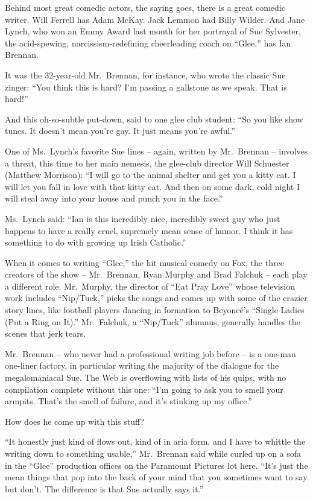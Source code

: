 ﻿\documentclass[12pt]{article}
\begin{document}
Behind most great comedic actors, the saying goes, there is a great comedic writer. Will Ferrell has
Adam McKay. Jack Lemmon had Billy Wilder. And Jane Lynch, who won an Emmy Award last month for her
portrayal of Sue Sylvester, the acid-spewing, narcissism-redefining cheerleading coach on ``Glee,''
has Ian Brennan.

It was the 32-year-old Mr.~Brennan, for instance, who wrote the classic Sue zinger: ``You think this
is hard? I'm passing a gallstone as we speak. That is hard!''

And this oh-so-subtle put-down, said to one glee club student: ``So you like show tunes. It doesn't
mean you're gay. It just means you're awful.''

One of Ms.~Lynch's favorite Sue lines -- again, written by Mr.~Brennan -- involves a threat, this
time to her main nemesis, the glee-club director Will Schuester (Matthew Morrison): ``I will go to
the animal shelter and get you a kitty cat. I will let you fall in love with that kitty cat. And
then on some dark, cold night I will steal away into your house and punch you in the face.''

Ms.~Lynch said: ``Ian is this incredibly nice, incredibly sweet guy who just happens to have a
really cruel, supremely mean sense of humor. I think it has something to do with growing up Irish
Catholic.''

When it comes to writing ``Glee,'' the hit musical comedy on Fox, the three creators of the show --
Mr.~Brennan, Ryan Murphy and Brad Falchuk -- each play a different role. Mr.~Murphy, the director of
``Eat Pray Love'' whose television work includes ``Nip/Tuck,'' picks the songs and comes up with
some of the crazier story lines, like football players dancing in formation to Beyonc\'e's ``Single
Ladies (Put a Ring on It).'' Mr.~Falchuk, a ``Nip/Tuck'' alumnus, generally handles the scenes that
jerk tears.

Mr.~Brennan -- who never had a professional writing job before -- is a one-man one-liner factory, in
particular writing the majority of the dialogue for the megalomaniacal Sue. The Web is overflowing
with lists of his quips, with no compilation complete without this one: ``I'm going to ask you to
smell your armpits. That's the smell of failure, and it's stinking up my office.''

How does he come up with this stuff?

``It honestly just kind of flows out, kind of in aria form, and I have to whittle the writing down
to something usable,'' Mr.~Brennan said while curled up on a sofa in the ``Glee'' production offices
on the Paramount Pictures lot here. ``It's just the mean things that pop into the back of your mind
that you sometimes want to say but don't. The difference is that Sue actually says it.''
\end{document}
